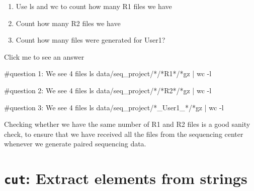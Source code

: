 \documentclass[
  letterpaper,
  DIV=11,
  numbers=noendperiod]{scrreprt}
\newenvironment{Shaded}{}{}
\newcommand{\AttributeTok}[1]{\textcolor[rgb]{0.84,0.23,0.29}{#1}}
\newcommand{\CommentTok}[1]{\textcolor[rgb]{0.42,0.45,0.49}{#1}}
\newcommand{\FunctionTok}[1]{\textcolor[rgb]{0.44,0.26,0.76}{#1}}
\newcommand{\KeywordTok}[1]{\textcolor[rgb]{0.84,0.23,0.29}{#1}}
\newcommand{\NormalTok}[1]{\textcolor[rgb]{0.14,0.16,0.18}{#1}}
\newcommand{\PreprocessorTok}[1]{\textcolor[rgb]{0.84,0.23,0.29}{#1}}
\providecommand{\tightlist}{%
  \setlength{\itemsep}{0pt}\setlength{\parskip}{0pt}}\usepackage{longtable,booktabs,array}
\begin{document}
\begin{tcolorbox}[enhanced jigsaw, bottomtitle=1mm, colframe=quarto-callout-caution-color-frame, left=2mm, leftrule=.75mm, coltitle=black, colbacktitle=quarto-callout-caution-color!10!white, toprule=.15mm, rightrule=.15mm, opacityback=0, titlerule=0mm, colback=white, breakable, bottomrule=.15mm, title=\textcolor{quarto-callout-caution-color}{\faFire}\hspace{0.5em}{Exercise}, arc=.35mm, toptitle=1mm, opacitybacktitle=0.6]

\begin{enumerate}
\def\labelenumi{\arabic{enumi}.}
\tightlist
\item
  Use ls and wc to count how many R1 files we have
\item
  Count how many R2 files we have
\item
  Count how many files were generated for User1?
\end{enumerate}

Click me to see an answer

\begin{Shaded}
\begin{Highlighting}[]
\CommentTok{\#question 1: We see 4 files}
\FunctionTok{ls}\NormalTok{ data/seq\_project/}\PreprocessorTok{*}\NormalTok{/}\PreprocessorTok{*}\NormalTok{R1}\PreprocessorTok{*}\NormalTok{/}\PreprocessorTok{*}\NormalTok{gz }\KeywordTok{|} \FunctionTok{wc} \AttributeTok{{-}l} 

\CommentTok{\#question 2: We see 4 files}
\FunctionTok{ls}\NormalTok{ data/seq\_project/}\PreprocessorTok{*}\NormalTok{/}\PreprocessorTok{*}\NormalTok{R2}\PreprocessorTok{*}\NormalTok{/}\PreprocessorTok{*}\NormalTok{gz }\KeywordTok{|} \FunctionTok{wc} \AttributeTok{{-}l} 

\CommentTok{\#question 3: We see 4 files}
\FunctionTok{ls}\NormalTok{ data/seq\_project/}\PreprocessorTok{*}\NormalTok{\_User1\_}\PreprocessorTok{*}\NormalTok{/}\PreprocessorTok{*}\NormalTok{gz }\KeywordTok{|} \FunctionTok{wc} \AttributeTok{{-}l} 
\end{Highlighting}
\end{Shaded}

Checking whether we have the same number of R1 and R2 files is a good
sanity check, to ensure that we have received all the files from the
sequencing center whenever we generate paired sequencing data.

\end{tcolorbox}

\section{\texorpdfstring{\texttt{cut}: Extract elements from
strings}{cut: Extract elements from strings}}\label{cut-extract-elements-from-strings}
\end{document}
